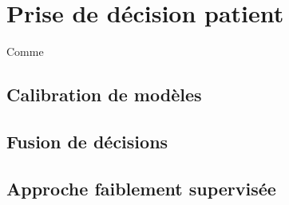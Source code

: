 \chapter{Prise de décision patient}
\label{chap:chapter_6}
\chapterintro
Comme 	
\newpage

\section{Calibration de modèles}
\section{Fusion de décisions}
\section{Approche faiblement supervisée}
